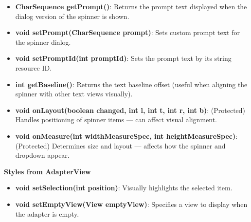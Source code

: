 \documentclass{report}
\begin{document}
\begin{itemize}
\begin{itemize}
        \item \textbf{CharSequence getPrompt()}: Returns the prompt text displayed when the dialog version of the spinner is shown.
        \item \textbf{void setPrompt(CharSequence prompt)}: Sets custom prompt text for the spinner dialog.
        \item \textbf{void setPromptId(int promptId)}: Sets the prompt text by its string resource ID.
        \item \textbf{int getBaseline()}: Returns the text baseline offset (useful when aligning the spinner with other text views visually).
        \item \textbf{void onLayout(boolean changed, int l, int t, int r, int b)}: (Protected) Handles positioning of spinner items — can affect visual alignment.
        \item \textbf{void onMeasure(int widthMeasureSpec, int heightMeasureSpec)}: (Protected) Determines size and layout — affects how the spinner and dropdown appear.
    \end{itemize}
    \textbf{Styles from AdapterView}
    \begin{itemize}
        \item \textbf{void setSelection(int position)}: Visually highlights the selected item.
        \item \textbf{void setEmptyView(View emptyView)}: Specifies a view to display when the adapter is empty.
    \end{itemize}



    \pagebreak 

\end{itemize}
\end{document}

